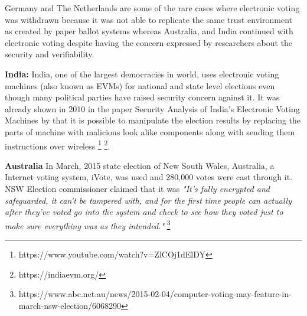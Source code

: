   
  Germany and The Netherlands are some of the rare cases where 
  electronic voting was withdrawn because it was not able to 
  replicate the same trust environment as created by paper 
  ballot systems whereas Australia, and India continued 
  with electronic voting despite having the concern expressed 
  by researchers about the security and verifiability. 
  
  \textbf{India:}
  India, one of the largest democracies in world, 
  uses electronic voting machines (also known as EVMs) for national 
  and state level  elections even though many political parties have raised security 
  concern against it. It was already shown in 2010 in the paper 
  Security Analysis of India's Electronic Voting Machines by 
  \cite{Wolchok:2010:SAI:1866307.1866309}  that it 
  is possible to manipulate the election results by replacing the 
  parts of machine with malicious look alike components along with sending 
  them instructions over wireless
  \footnote{https://www.youtube.com/watch?v=ZlCOj1dElDY} 
  \footnote{https://indiaevm.org/}. 
  
%  

 \textbf{Australia}
  In March, 2015 state election 
  of New South Wales, Australia, a Internet voting system, iVote,    
  was used and 280,000 votes were cast through it. NSW Election 
  commissioner claimed that it was 
 \textit{
 "It's fully encrypted and safeguarded, it can't be tampered with, 
 and for the first time people can actually after they've voted 
 go into the system and check to see how they voted just to make 
 sure everything was as they intended." }
 \footnote{https://www.abc.net.au/news/2015-02-04/computer-voting-may-feature-in-march-nsw-election/6068290} 

